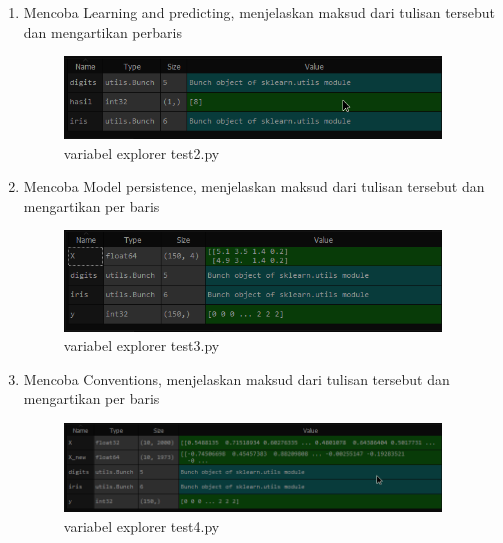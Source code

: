 \begin{enumerate}
		\item Mencoba Learning and predicting, menjelaskan maksud dari tulisan tersebut dan mengartikan perbaris	
			

			\begin{figure}[H]
				\begin{center}
				 \includegraphics[width=10cm]{figures/1174067/1/test2.png}
				 \caption{variabel explorer test2.py}	
				\end{center}
			\end{figure}
			
			
		\item Mencoba Model persistence, menjelaskan maksud dari tulisan tersebut dan mengartikan per baris
						
	
			\begin{figure}[H]
				\begin{center}
				 \includegraphics[width=10cm]{figures/1174067/1/test3.png}
				 \caption{variabel explorer test3.py}	
				\end{center}
			\end{figure}
			
	
		\item Mencoba Conventions, menjelaskan maksud dari tulisan tersebut dan mengartikan per baris
						
	
			\begin{figure}[H]
				\begin{center}
				 \includegraphics[width=10cm]{figures/1174067/1/test4ve.png}
				 \caption{variabel explorer test4.py}	
				\end{center}
			\end{figure}
			

\end{enumerate}
